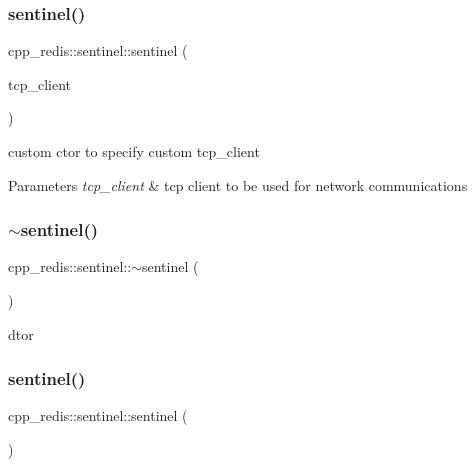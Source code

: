 \subsubsection{\texorpdfstring{sentinel()}{sentinel()}\hspace{0.1cm}{\footnotesize\ttfamily [2/3]}}
{\footnotesize\ttfamily cpp\+\_\+redis\+::sentinel\+::sentinel (\begin{DoxyParamCaption}\item[{const std\+::shared\+\_\+ptr$<$ \hyperlink{classcpp__redis_1_1network_1_1tcp__client__iface}{network\+::tcp\+\_\+client\+\_\+iface} $>$ \&}]{tcp\+\_\+client }\end{DoxyParamCaption})\hspace{0.3cm}{\ttfamily [explicit]}}

custom ctor to specify custom tcp\+\_\+client


\begin{DoxyParams}{Parameters}
{\em tcp\+\_\+client} & tcp client to be used for network communications \\
\hline
\end{DoxyParams}
\mbox{\label{classcpp__redis_1_1sentinel_af8535e89714db8ddcd7e74337ee5385a}} 
\subsubsection{\texorpdfstring{$\sim$sentinel()}{~sentinel()}}
{\footnotesize\ttfamily cpp\+\_\+redis\+::sentinel\+::$\sim$sentinel (\begin{DoxyParamCaption}\item[{void}]{ }\end{DoxyParamCaption})}



dtor 

\mbox{\label{classcpp__redis_1_1sentinel_a4c3b68f6e930b2e9723816bb8bed5a8f}} 
\subsubsection{\texorpdfstring{sentinel()}{sentinel()}\hspace{0.1cm}{\footnotesize\ttfamily [3/3]}}
{\footnotesize\ttfamily cpp\+\_\+redis\+::sentinel\+::sentinel (\begin{DoxyParamCaption}\item[{const \hyperlink{classcpp__redis_1_1sentinel}{sentinel} \&}]{ }\end{DoxyParamCaption})\hspace{0.3cm}{\ttfamily [delete]}}



